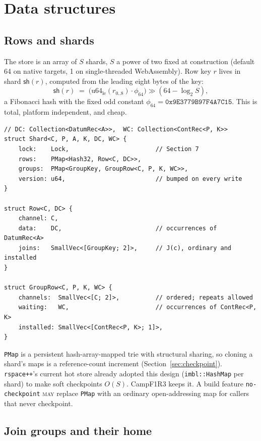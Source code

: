 \documentclass[11pt]{article}
\theoremstyle{plain}
\theoremstyle{definition}
\newcommand{\Camp}{CampF1R3}
\newcommand{\sh}{\mathsf{sh}}
\newcommand{\MAY}{\textsc{may}}
\newcommand{\code}[1]{\texttt{#1}}
\begin{document}
\section{Data structures}\label{sec:data}

\subsection{Rows and shards}

The store is an array of $S$ shards, $S$ a power of two fixed at construction
(default 64 on native targets, 1 on single-threaded WebAssembly). Row key $r$ lives
in shard $\sh(r)$, computed from the leading eight bytes of the key:
\[
  \sh(r) \;=\; \big(\mathrm{u64}_{\mathrm{le}}(r_{0..8}) \cdot \phi_{64}\big) \gg (64-\log_2 S),
\]
a Fibonacci hash with the fixed odd constant $\phi_{64}=\mathtt{0x9E3779B97F4A7C15}$.
This is total, platform independent, and cheap.

\begin{lstlisting}
// DC: Collection<DatumRec<A>>,  WC: Collection<ContRec<P, K>>
struct Shard<C, P, A, K, DC, WC> {
    lock:    Lock,                        // Section 7
    rows:    PMap<Hash32, Row<C, DC>>,
    groups:  PMap<GroupKey, GroupRow<C, P, K, WC>>,
    version: u64,                         // bumped on every write
}

struct Row<C, DC> {
    channel: C,
    data:    DC,                          // occurrences of DatumRec<A>
    joins:   SmallVec<[GroupKey; 2]>,     // J(c), ordinary and installed
}

struct GroupRow<C, P, K, WC> {
    channels:  SmallVec<[C; 2]>,          // ordered; repeats allowed
    waiting:   WC,                        // occurrences of ContRec<P, K>
    installed: SmallVec<[ContRec<P, K>; 1]>,
}
\end{lstlisting}

\code{PMap} is a persistent hash-array-mapped trie with structural sharing, so
cloning a shard's maps is a reference-count increment (Section~\ref{sec:checkpoint}).
\code{rspace++}'s current hot store already adopted this design
(\code{imbl::HashMap} per shard) to make soft checkpoints $O(S)$. \Camp{} keeps it.
A build feature \code{no-checkpoint} \MAY{} replace \code{PMap} with an ordinary
open-addressing map for callers that never checkpoint.

\subsection{Join groups and their home}
\end{document}
